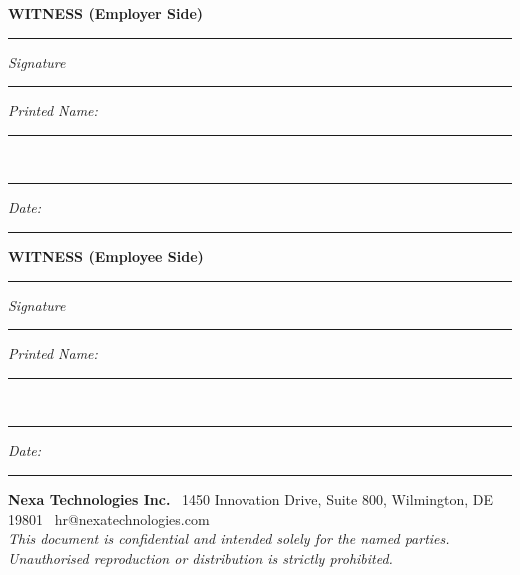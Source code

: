 \documentclass[11pt,a4paper]{article}
\begin{document}
\begin{tcolorbox}[ndabox, title={\faPen\enspace Signatures}]
  \noindent
  \begin{minipage}[t]{0.45\linewidth}
    \textbf{\color{NavyDeep}WITNESS (Employer Side)}\\[20pt]
    \hrule
    \vspace{4pt}
    \textit{Signature}\\[14pt]
    \hrule
    \vspace{4pt}
    \textit{Printed Name:}\enspace \rule{4.5cm}{0.4pt}\\[8pt]
    \hrule
    \vspace{4pt}
    \textit{Date:}\enspace \rule{4cm}{0.4pt}
  \end{minipage}%
  \hfill%
  \begin{minipage}[t]{0.45\linewidth}
    \textbf{\color{NavyDeep}WITNESS (Employee Side)}\\[20pt]
    \hrule
    \vspace{4pt}
    \textit{Signature}\\[14pt]
    \hrule
    \vspace{4pt}
    \textit{Printed Name:}\enspace \rule{4.5cm}{0.4pt}\\[8pt]
    \hrule
    \vspace{4pt}
    \textit{Date:}\enspace \rule{4cm}{0.4pt}
  \end{minipage}

\end{tcolorbox}

\vspace{12pt}

\begin{center}
  \small\color{MidGray}
  \textbf{Nexa Technologies Inc.} \textbar\ 1450 Innovation Drive, Suite 800,
  Wilmington, DE 19801 \textbar\ hr@nexatechnologies.com\\
  \textit{This document is confidential and intended solely for the named parties.
  Unauthorised reproduction or distribution is strictly prohibited.}
\end{center}
\end{document}
